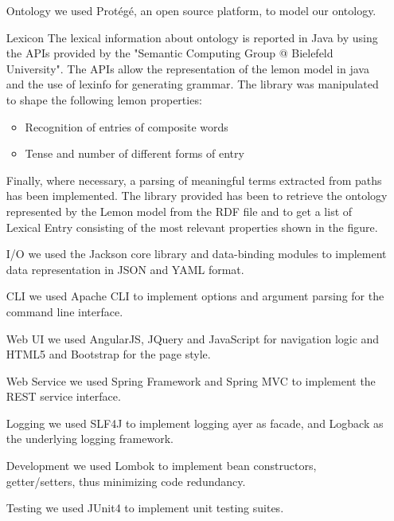 \begin{itemize}
	\item[Ontology] we used Protégé, an open source platform, to model our ontology.
	
	\item[Lexicon] The lexical information about ontology is reported in Java by using the APIs provided by the "Semantic Computing Group @ Bielefeld University". The APIs allow the representation of the lemon model in java and the use of lexinfo for generating grammar. The library was manipulated to shape the following lemon properties: 
	\begin{itemize}
		\item Recognition of entries of composite words
		\item Tense and number of different forms of entry 
	\end{itemize}	

Finally, where necessary, a parsing of meaningful terms extracted from paths has been implemented.
%
The library provided has been to retrieve the ontology represented by the Lemon model from the RDF file and to get a list of Lexical Entry consisting of the most relevant properties shown in the figure.

	\item[I/O] we used the Jackson core library and data-binding modules to implement data representation in JSON and YAML format.
	
	\item[CLI] we used Apache CLI to implement options and argument parsing for the command line interface.
	
	\item[Web UI] we used AngularJS, JQuery and JavaScript for navigation logic and HTML5 and Bootstrap for the page style.
	
	\item[Web Service] we used Spring Framework and Spring MVC to implement the REST service interface.
	
	\item[Logging] we used SLF4J to implement logging ayer as facade, and Logback as the underlying logging framework.
	
	\item[Development] we used Lombok to implement bean constructors, getter/setters, thus minimizing code redundancy.
	
	\item[Testing] we used JUnit4 to implement unit testing suites.
\end{itemize}

